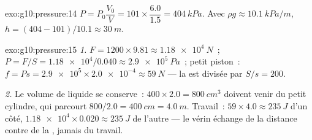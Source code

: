 \begin{solution}{exo:g10:pressure:14}
$P = P_0 \dfrac{V_0}{V} = 101 \times \dfrac{6.0}{1.5} =
\qty{404}{kPa}$. Avec $\rho g \approx \qty{10.1}{kPa/m}$,
$h = (404 - 101)/10.1 \approx \qty{30}{m}$.
\end{solution}

\begin{solution}{exo:g10:pressure:15}
\emph{1.}  $F = 1200 \times 9.81 \approx \qty{1.18e4}{N}$~;
 $P = F/S = \num{1.18e4}/0.040 \approx \qty{2.9e5}{Pa}$~;
petit piston~: $f = P s = \num{2.9e5} \times \num{2.0e-4} \approx
\qty{59}{N}$ --- la  est divisée par $S/s = 200$.

\emph{2.} Le volume de liquide se conserve~:
$400 \times 2.0 = \qty{800}{cm^3}$ doivent venir du petit cylindre,
qui parcourt $800/2.0 = \qty{400}{cm} = \qty{4.0}{m}$. Travail~:
$59 \times 4.0 \approx \qty{235}{J}$ d'un côté,
$\num{1.18e4} \times 0.020 \approx \qty{235}{J}$ de l'autre --- le
vérin échange de la distance contre de la , jamais du
travail.
\end{solution}

